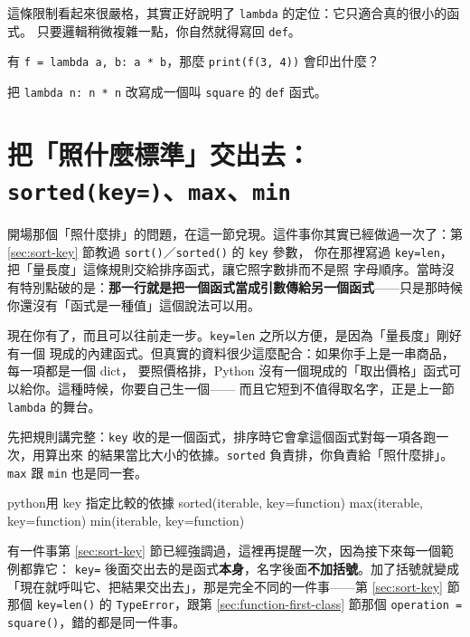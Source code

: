 這條限制看起來很嚴格，其實正好說明了 \texttt{lambda} 的定位：它只適合真的很小的函式。
只要邏輯稍微複雜一點，你自然就得寫回 \texttt{def}。

\begin{drills}[label=drills:lambda]
\item 有 \texttt{f = lambda a, b: a * b}，那麼 \texttt{print(f(3, 4))} 會印出什麼？
\item 把 \texttt{lambda n: n * n} 改寫成一個叫 \texttt{square} 的 \texttt{def} 函式。
\end{drills}

\section{把「照什麼標準」交出去：\texttt{sorted(key=)}、\texttt{max}、\texttt{min}}
\label{sec:key-function}

開場那個「照什麼排」的問題，在這一節兌現。這件事你其實已經做過一次了：第
\ref{sec:sort-key} 節教過 \texttt{sort()}／\texttt{sorted()} 的 \texttt{key} 參數，
你在那裡寫過 \texttt{key=len}，把「量長度」這條規則交給排序函式，讓它照字數排而不是照
字母順序。當時沒有特別點破的是：\textbf{那一行就是把一個函式當成引數傳給另一個函式}——只是那時候
你還沒有「函式是一種值」這個說法可以用。

現在你有了，而且可以往前走一步。\texttt{key=len} 之所以方便，是因為「量長度」剛好有一個
現成的內建函式。但真實的資料很少這麼配合：如果你手上是一串商品，每一項都是一個 dict，
要照價格排，Python 沒有一個現成的「取出價格」函式可以給你。這種時候，你要自己生一個——
而且它短到不值得取名字，正是上一節 \texttt{lambda} 的舞台。

先把規則講完整：\texttt{key} 收的是一個函式，排序時它會拿這個函式對每一項各跑一次，用算出來
的結果當比大小的依據。\texttt{sorted} 負責排，你負責給「照什麼排」。\texttt{max} 跟
\texttt{min} 也是同一套。

\begin{code}{python}{用 key 指定比較的依據}
sorted(iterable, key=function)
max(iterable, key=function)
min(iterable, key=function)
\end{code}

有一件事第 \ref{sec:sort-key} 節已經強調過，這裡再提醒一次，因為接下來每一個範例都靠它：
\texttt{key=} 後面交出去的是函式\textbf{本身}，名字後面\textbf{不加括號}。加了括號就變成
「現在就呼叫它、把結果交出去」，那是完全不同的一件事——第 \ref{sec:sort-key} 節那個
\texttt{key=len()} 的 \texttt{TypeError}，跟第 \ref{sec:function-first-class} 節那個
\texttt{operation = square()}，錯的都是同一件事。

